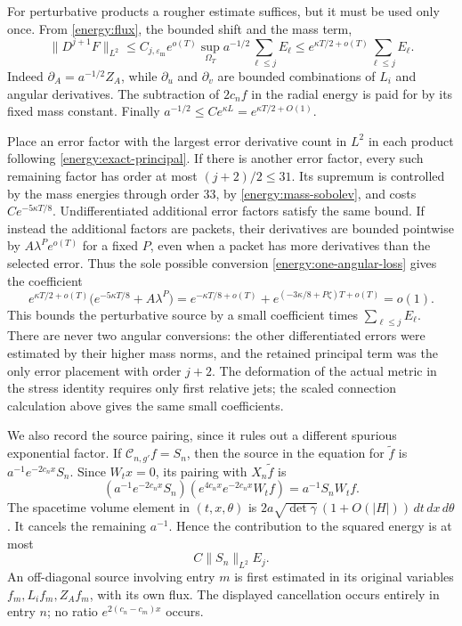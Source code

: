 For perturbative products a rougher estimate suffices, but it must be
used only once. From \eqref{energy:flux}, the bounded shift and the
mass term,
\begin{equation}\label{energy:one-angular-loss}
 \lVert D^{j+1}F\rVert_{L^2}
   \le C_{j,\varepsilon_{\mathrm m}}e^{o(T)}
             \sup_{\Omega_T}a^{-1/2}\sum_{\ell\le j}E_\ell
   \le e^{\kappa T/2+o(T)}\sum_{\ell\le j}E_\ell.
\end{equation}
Indeed \(\partial_A=a^{-1/2}Z_A\), while \(\partial_u\) and
\(\partial_v\) are bounded combinations of \(L_i\) and angular
derivatives. The subtraction of \(2c_n f\) in the radial energy is
paid for by its fixed mass constant. Finally
\(a^{-1/2}\le C e^{\kappa L}=e^{\kappa T/2+O(1)}\).

Place an error factor with the largest error derivative count in
\(L^2\) in each product following \eqref{energy:exact-principal}.
If there is another error factor, every such remaining factor has
order at most \((j+2)/2\le31\). Its supremum is controlled by the
mass energies through order 33, by \eqref{energy:mass-sobolev}, and
costs \(Ce^{-5\kappa T/8}\). Undifferentiated additional error
factors satisfy the same bound. If instead the additional factors
are packets, their derivatives are bounded pointwise by
\(A\lambda^P e^{o(T)}\) for a fixed \(P\), even when a packet has
more derivatives than the selected error. Thus the sole possible
conversion \eqref{energy:one-angular-loss} gives the coefficient
\begin{equation}\label{energy:nonlinear-small-rate}
 e^{\kappa T/2+o(T)}
       \bigl(e^{-5\kappa T/8}+A\lambda^P\bigr)
  =e^{-\kappa T/8+o(T)}
       +e^{(-3\kappa/8+P\zeta)T+o(T)}=o(1).
\end{equation}
This bounds the perturbative source by a small coefficient times
\(\sum_{\ell\le j}E_\ell\). There are never two angular conversions:
the other differentiated errors were estimated by their higher mass
norms, and the retained principal term was the only error placement
with order \(j+2\). The deformation of the actual metric in the
stress identity requires only first relative jets; the scaled
connection calculation above gives the same small coefficients.

We also record the source pairing, since it rules out a different
spurious exponential factor. If \(\mathcal C_{n,g'}f=S_n\), then
the source in the equation for \(\widetilde f\) is
\(a^{-1}e^{-2c_nx}S_n\). Since \(W_tx=0\), its pairing with
\(X_n\widetilde f\) is
\[
 (a^{-1}e^{-2c_nx}S_n)
       (e^{4c_nx}e^{-2c_nx}W_tf)=a^{-1}S_nW_tf.
\]
The spacetime volume element in \((t,x,\theta)\) is
\(2a\sqrt{\det\gamma}\,(1+O(|H|))\,dt\,dx\,d\theta\).
It cancels the remaining \(a^{-1}\). Hence the contribution to the
squared energy is at most
\begin{equation}\label{energy:source-pairing}
 C\lVert S_n\rVert_{L^2}E_j.
\end{equation}
An off-diagonal source involving entry \(m\) is first estimated in
its original variables \(f_m,L_if_m,Z_Af_m\), with its own flux.
The displayed cancellation occurs entirely in entry \(n\); no ratio
\(e^{2(c_n-c_m)x}\) occurs.

